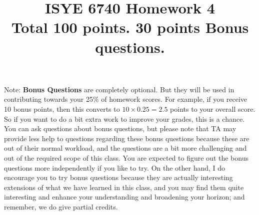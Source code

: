 \documentclass[twoside,10pt]{article}
\begin{document}
\title{ISYE 6740 Homework 4\\ 
\small Total 100 points. 30 points Bonus questions.}
\date{}
\maketitle



Note: {\bf Bonus Questions} are completely optional. But they will be used in contributing towards your 25\% of homework scores. For example, if you receive 10 bonus points, then this converts to $10\times 0.25=2.5$ points to your overall score. So if you want to do a bit extra work to improve your grades, this is a chance. You can ask questions about bonus questions, but please note that TA may provide less help to questions regarding these bonus questions because these are out of their normal workload, and the questions are a bit more challenging and out of the required scope of this class. You are expected to figure out the bonus questions more independently if you like to try. On the other hand, I do encourage you to try bonus questions because they are actually interesting extensions of what we have learned in this class, and you may find them quite interesting and enhance your understanding and broadening your horizon; and remember, we do give partial credits.  
\end{document}
